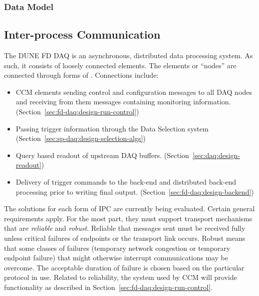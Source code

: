 \subsubsection{Data Model}
\label{sec:fd-daq:design-data-model}



\subsection{Inter-process Communication}
\label{sec:daq:design-ipc}

The DUNE FD DAQ is an asynchronous, distributed data processing system. 
As such, it consists of loosely connected elements.
The elements or ``nodes'' are connected through forms of .
Connections include:

\begin{itemize}
\item CCM elements sending control and configuration messages to all DAQ nodes and receiving from them messages containing monitoring information.  (Section~\ref{sec:fd-daq:design-run-control})
\item Passing trigger information through the Data Selection system (Section~\ref{sec:sp-daq:design-selection-algs})
\item Query based readout of upstream DAQ buffers. (Section~\ref{sec:daq:design-readout})
\item Delivery of trigger commands to the back-end and distributed back-end processing prior to writing final output. (Section~\ref{sec:fd-daq:design-backend})
\end{itemize}

The solutions for each form of IPC are currently being evaluated. 
Certain general requirements apply.
For the most part, they must support transport mechanisms that are \textit{reliable} and \textit{robust}. 
Reliable that messages sent must be received fully unless critical failures of endpoints or the transport link occurs.  Robust means that some classes of failures (temporary network congestion or temporary endpoint failure) that might otherwise interrupt communications may be overcome.
The acceptable duration of failure is chosen based on the particular protocol in use.
Related to reliability, the   system used by CCM will provide  functionality as described in Section~\ref{sec:fd-daq:design-run-control}.

